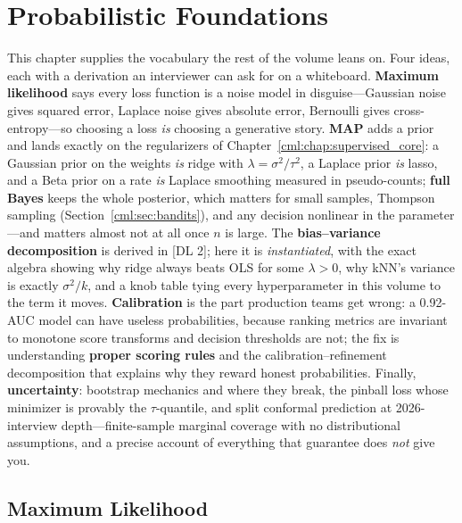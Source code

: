 \chapter{Probabilistic Foundations}
\label{cml:chap:probabilistic_foundations}

\begin{tldr}
This chapter supplies the vocabulary the rest of the volume leans on. Four ideas, each with a derivation an interviewer can ask for on a whiteboard. \textbf{Maximum likelihood} says every loss function is a noise model in disguise---Gaussian noise gives squared error, Laplace noise gives absolute error, Bernoulli gives cross-entropy---so choosing a loss \textit{is} choosing a generative story. \textbf{MAP} adds a prior and lands exactly on the regularizers of Chapter~\ref{cml:chap:supervised_core}: a Gaussian prior on the weights \textit{is} ridge with $\lambda = \sigma^2/\tau^2$, a Laplace prior \textit{is} lasso, and a Beta prior on a rate \textit{is} Laplace smoothing measured in pseudo-counts; \textbf{full Bayes} keeps the whole posterior, which matters for small samples, Thompson sampling (Section~\ref{cml:sec:bandits}), and any decision nonlinear in the parameter---and matters almost not at all once $n$ is large. The \textbf{bias--variance decomposition} is derived in [DL 2]; here it is \textit{instantiated}, with the exact algebra showing why ridge always beats OLS for some $\lambda>0$, why kNN's variance is exactly $\sigma^2/k$, and a knob table tying every hyperparameter in this volume to the term it moves. \textbf{Calibration} is the part production teams get wrong: a 0.92-AUC model can have useless probabilities, because ranking metrics are invariant to monotone score transforms and decision thresholds are not; the fix is understanding \textbf{proper scoring rules} and the calibration--refinement decomposition that explains why they reward honest probabilities. Finally, \textbf{uncertainty}: bootstrap mechanics and where they break, the pinball loss whose minimizer is provably the $\tau$-quantile, and split conformal prediction at 2026-interview depth---finite-sample marginal coverage with no distributional assumptions, and a precise account of everything that guarantee does \textit{not} give you.
\end{tldr}

\section{Maximum Likelihood}
\label{cml:sec:mle}


